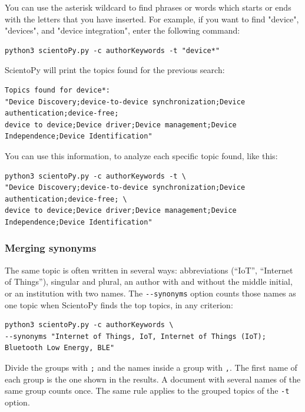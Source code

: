 \documentclass[10pt,letterpaper]{article}
\begin{document}
You can use the asterisk wildcard to find phrases or words which starts or ends with the letters that you have inserted. For example, if you want to find "device", "devices", and "device integration", enter the following command: 

\begin{verbatim}
python3 scientoPy.py -c authorKeywords -t "device*"
\end{verbatim}

ScientoPy will print the topics found for the previous search: 

\begin{verbatim}
Topics found for device*:
"Device Discovery;device-to-device synchronization;Device authentication;device-free;
device to device;Device driver;Device management;Device Independence;Device Identification"
\end{verbatim}

You can use this information, to analyze each specific topic found, like this: 

\begin{verbatim}
python3 scientoPy.py -c authorKeywords -t \
"Device Discovery;device-to-device synchronization;Device authentication;device-free; \
device to device;Device driver;Device management;Device Independence;Device Identification"
\end{verbatim}

\subsubsection{Merging synonyms}
\label{sec_synonyms}

The same topic is often written in several ways: abbreviations (``IoT'', ``Internet of Things''), singular and plural, an author with and without the middle initial, or an institution with two names. The \verb|--synonyms| option counts those names as one topic when ScientoPy finds the top topics, in any criterion:

\begin{verbatim}
python3 scientoPy.py -c authorKeywords \
--synonyms "Internet of Things, IoT, Internet of Things (IoT); Bluetooth Low Energy, BLE"
\end{verbatim}

Divide the groups with \verb|;| and the names inside a group with \verb|,|. The first name of each group is the one shown in the results. A document with several names of the same group counts once. The same rule applies to the grouped topics of the \verb|-t| option.
\end{document}
